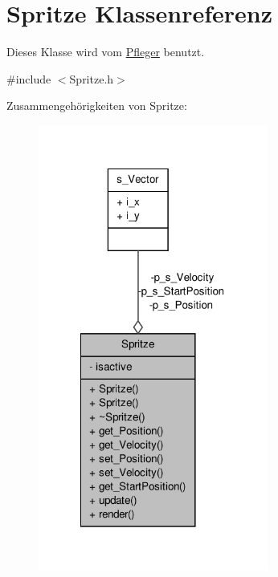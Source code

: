 \hypertarget{class_spritze}{\section{Spritze Klassenreferenz}
\label{class_spritze}
}


Dieses Klasse wird vom \hyperlink{class_pfleger}{Pfleger} benutzt.  




{\ttfamily \#include $<$Spritze.\-h$>$}



Zusammengehörigkeiten von Spritze\-:
\nopagebreak
\begin{figure}[H]
\begin{center}
\leavevmode
\includegraphics[width=214pt]{class_spritze__coll__graph}
\end{center}
\end{figure}
